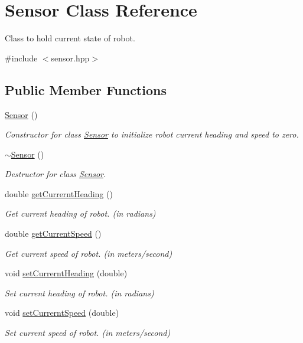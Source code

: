 \hypertarget{classSensor}{}\section{Sensor Class Reference}
\label{classSensor}


Class to hold current state of robot.  




{\ttfamily \#include $<$sensor.\+hpp$>$}

\subsection*{Public Member Functions}
\begin{DoxyCompactItemize}
\item 
\mbox{\label{classSensor_a342d6d11ef572c8cba92cb76fb1a294b}} 
\hyperlink{classSensor_a342d6d11ef572c8cba92cb76fb1a294b}{Sensor} ()
\begin{DoxyCompactList}\small\item\em Constructor for class \hyperlink{classSensor}{Sensor} to initialize robot current heading and speed to zero. \end{DoxyCompactList}\item 
\mbox{\label{classSensor_aee8c70e7ef05ce65e7ee33686b5d7db2}} 
\hyperlink{classSensor_aee8c70e7ef05ce65e7ee33686b5d7db2}{$\sim$\+Sensor} ()
\begin{DoxyCompactList}\small\item\em Destructor for class \hyperlink{classSensor}{Sensor}. \end{DoxyCompactList}\item 
double \hyperlink{classSensor_a5bf3c3f5dfa3048bb702b5d3164bd410}{get\+Currernt\+Heading} ()
\begin{DoxyCompactList}\small\item\em Get current heading of robot. (in radians) \end{DoxyCompactList}\item 
double \hyperlink{classSensor_afea96ceec4830e07ed61f4ec12e45dec}{get\+Current\+Speed} ()
\begin{DoxyCompactList}\small\item\em Get current speed of robot. (in meters/second) \end{DoxyCompactList}\item 
void \hyperlink{classSensor_ade56b78666a057ce576aad448a2a5ecd}{set\+Currernt\+Heading} (double)
\begin{DoxyCompactList}\small\item\em Set current heading of robot. (in radians) \end{DoxyCompactList}\item 
void \hyperlink{classSensor_ac5cbcf17f5dc8a4d8ca545d657255f54}{set\+Currernt\+Speed} (double)
\begin{DoxyCompactList}\small\item\em Set current speed of robot. (in meters/second) \end{DoxyCompactList}\end{DoxyCompactItemize}


